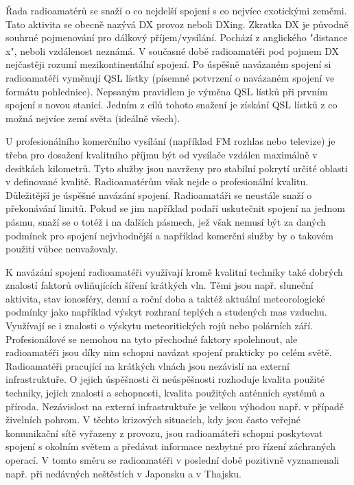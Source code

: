 Řada radioamatérů se snaží o co nejdelší spojení s co nejvíce exotickými zeměmi.
Tato aktivita se obecně nazývá DX provoz neboli DXing. Zkratka DX je původně souhrné pojmenování
pro dálkový příjem/vysílání. Pochází z anglického "distance
x", neboli vzdálenost neznámá. V současné době radioamatéři pod pojmem DX
nejčastěji rozumí mezikontinentální spojení.
Po úspěšně navázaném spojení si radioamatéři vyměnují QSL lístky (písemné potvrzení o
navázaném spojení ve formátu pohlednice). Nepsaným pravidlem je výměna QSL
lístků při prvním spojení s novou stanicí. Jedním z cílů tohoto snažení je
získání QSL lístků z co možná nejvíce zemí světa (ideálně všech).

U profesionálního komerčního vysílání (například FM rozhlas nebo
televize) je třeba pro dosažení kvalitního příjmu být od vysílače vzdálen maximálně
v desítkách kilometrů. Tyto služby jsou navrženy pro stabilní pokrytí určité
oblasti v definované kvalitě. Radioamatérům však nejde o profesionální kvalitu.
Důležitější je úspěšné navázání spojení. Radioamatáři se neustále snaží o překonávání limitů.
Pokud se jim například podaří uskutečnit spojení na jednom pásmu,
snaží se o totéž i na dalších pásmech, jež však nemusí být za daných
podmínek pro spojení nejvhodnější a například komerční služby by o takovém
použití vůbec neuvažovaly.

K navázání spojení radioamatéři využívají kromě
kvalitní techniky také dobrých znalostí faktorů
ovliňujících šíření krátkých vln. Těmi jsou např. sluneční aktivita,
stav ionosféry, denní a roční doba a taktéž aktuální meteorologické podmínky
jako například výskyt
rozhraní teplých a studených mas vzduchu. Využívají se i znalosti o výskytu
meteoritických rojů nebo polárních září. Profesionálové se nemohou na tyto přechodné faktory spolehnout, ale 
radioamatéři jsou díky nim schopni navázat spojení prakticky po celém světě.
Radioamatéři pracující na krátkých vlnách jsou nezávislí na externí
infrastruktuře. O jejich úspěšnosti či neúspěšnosti rozhoduje kvalita použité techniky,
jejich znalosti a schopnosti, kvalita použitých anténních systémů a příroda. Nezávislost na externí infrastruktuře je velkou výhodou např. v
případě živelních pohrom. V těchto krizových situacích, kdy jsou často veřejné
komunikační sítě vyřazeny z provozu, jsou radioamáteři schopni poskytovat
spojení s okolním světem a předávat informace nezbytné pro řízení záchraných
operací. V tomto směru se radioamatéři v poslední době pozitivně vyznamenali
např. při nedávných neštěstích v Japonsku a v Thajsku. 

